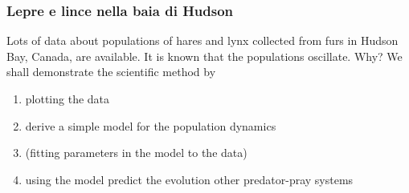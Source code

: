 \documentclass{beamer}
\begin{document}
\begin{frame}
\frametitle{Lepre e lince nella baia di Hudson}

\begin{block}{}
Lots of data about populations of hares and lynx collected from furs in Hudson Bay, Canada, are available. It is known that the populations oscillate. Why?
We shall demonstrate the scientific method by

\begin{enumerate}
\item plotting the data

\item derive a simple model for the population dynamics

\item (fitting parameters in the model to the data)

\item using the model predict the evolution other predator-pray systems
\end{enumerate}

\noindent
\end{block}
\end{frame}
\end{document}
